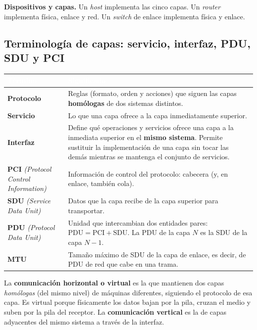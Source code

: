 \documentclass[11pt,a4paper]{article}
\newcommand{\hd}[1]{\cellcolor{uahblue}\textcolor{white}{\textbf{#1}}}
\newcommand{\en}[1]{\emph{(#1)}}
\begin{document}
\textbf{Dispositivos y capas.} Un \emph{host} implementa las cinco capas. Un \emph{router} implementa física, enlace y red. Un \emph{switch} de enlace implementa física y enlace.

\subsection{Terminología de capas: servicio, interfaz, PDU, SDU y PCI}

\begin{tabularx}{\textwidth}{@{}L{3.4cm}X@{}}
\toprule
\hd{Término} & \hd{Significado} \\
\midrule
\textbf{Protocolo} & Reglas (formato, orden y acciones) que siguen las capas \textbf{homólogas} de dos sistemas distintos. \\
\textbf{Servicio} & Lo que una capa ofrece a la capa inmediatamente superior. \\
\textbf{Interfaz} & Define qué operaciones y servicios ofrece una capa a la inmediata superior en el \textbf{mismo sistema}. Permite sustituir la implementación de una capa sin tocar las demás mientras se mantenga el conjunto de servicios. \\
\textbf{PCI} \en{Protocol Control Information} & Información de control del protocolo: cabecera (y, en enlace, también cola). \\
\textbf{SDU} \en{Service Data Unit} & Datos que la capa recibe de la capa superior para transportar. \\
\textbf{PDU} \en{Protocol Data Unit} & Unidad que intercambian dos entidades pares: $\text{PDU}=\text{PCI}+\text{SDU}$. La PDU de la capa $N$ es la SDU de la capa $N-1$. \\
\textbf{MTU} & Tamaño máximo de SDU de la capa de enlace, es decir, de PDU de red que cabe en una trama. \\
\bottomrule
\end{tabularx}

\begin{definicion}
La \textbf{comunicación horizontal o virtual} es la que mantienen dos capas \emph{homólogas} (del mismo nivel) de máquinas diferentes, siguiendo el protocolo de esa capa. Es virtual porque físicamente los datos bajan por la pila, cruzan el medio y suben por la pila del receptor. La \textbf{comunicación vertical} es la de capas adyacentes del mismo sistema a través de la interfaz.
\end{definicion}
\end{document}
